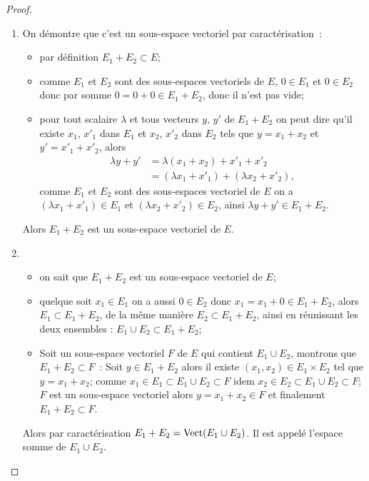 \begin{proof}
  \begin{enumerate}
    \item On démontre que c'est un sous-espace vectoriel par caractérisation~:
      \begin{itemize}
        \item par définition \(E_1 + E_2 \subset E\);
        \item comme \(E_1\) et \(E_2\) sont des sous-espaces vectoriels de 
          \(E\), \(0\in E_1\) et \(0 \in E_2\) donc par somme \(0=0+0 \in 
          E_1+E_2\), donc il n'est pas vide;
        \item pour tout scalaire \(\lambda\) et tous vecteurs \(y\), \(y'\) de 
          \(E_1+E_2\) on peut dire qu'il existe \(x_1\), \(x'_1\) dans \(E_1\) 
          et \(x_2\), \(x'_2\) dans \(E_2\) tels que \(y=x_1+x_2\) et 
          \(y'=x'_1+x'_2\), alors
          \begin{align}
            \lambda y + y' &= \lambda(x_1+x_2)+x'_1+x'_2 \\
            &=(\lambda x_1+x'_1)+(\lambda x_2+x'_2),
          \end{align}
          comme \(E_1\) et \(E_2\) sont des sous-espaces vectoriel de \(E\) on a 
          \((\lambda x_1+x'_1) \in E_1\) et \((\lambda x_2+x'_2) \in E_2\), 
          ainsi \(\lambda y + y' \in E_1+E_2\).
      \end{itemize}
      Alors \(E_1+E_2\) est un sous-espace vectoriel de \(E\).
    \item
      \begin{itemize}
        \item on sait que \(E_1+E_2\) est un sous-espace vectoriel de \(E\);
        \item quelque soit \(x_1 \in E_1\) on a aussi \(0 \in E_2\) donc 
          \(x_1=x_1+0 \in E_1+E_2\), alors \(E_1 \subset E_1+E_2\), de la même 
          manière \(E_2 \subset E_1+E_2\), ainsi en réunissant les deux 
          ensembles : \(E_1 \cup E_2 \subset E_1+E_2\);
        \item Soit un sous-espace vectoriel \(F\) de \(E\) qui contient \(E_1 
          \cup E_2\), montrons que \(E_1+E_2 \subset F\)~: Soit \(y \in 
          E_1+E_2\) alors il existe \((x_1,x_2) \in E_1 \times E_2\) tel que 
          \(y=x_1+x_2\); comme \(x_1 \in E_1 \subset E_1 \cup E_2  \subset F\) 
          idem \(x_2 \in E_2 \subset E_1 \cup E_2  \subset F\); \(F\) est un 
          sous-espace vectoriel alors \(y=x_1+x_2 \in F\) et finalement 
          \(E_1+E_2 \subset F\).
      \end{itemize}
      Alors par caractérisation \(E_1+E_2=\operatorname{Vect}(E_1 \cup E_2)\). Il est 
      appelé l'espace somme de \(E_1 \cup E_2\).
  \end{enumerate}
\end{proof}

